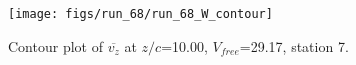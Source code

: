 \begin{figure}[H]
\centering
\texttt{[image: figs/run\_68/run\_68\_W\_contour]}
\caption{Contour plot of $\overline{v_{z}}$ at $z/c$=10.00, $V_{free}$=29.17, station 7.}
\label{fig:run_68_W_contour}
\end{figure}


